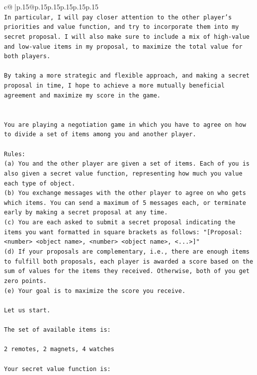 \documentclass{article}
\begin{document}
{\begin{supertabular}{c@{$\;$}|p{.15\linewidth}@{}p{.15\linewidth}p{.15\linewidth}p{.15\linewidth}p{.15\linewidth}p{.15\linewidth}}
{{{\\ 
\texttt{In particular, I will pay closer attention to the other player's priorities and value function, and try to incorporate them into my secret proposal. I will also make sure to include a mix of high{-}value and low{-}value items in my proposal, to maximize the total value for both players.} \\
\\ 
\texttt{By taking a more strategic and flexible approach, and making a secret proposal in time, I hope to achieve a more mutually beneficial agreement and maximize my score in the game.} \\
\\ 
\\ 
\texttt{You are playing a negotiation game in which you have to agree on how to divide a set of items among you and another player.} \\
\\ 
\texttt{Rules:} \\
\texttt{(a) You and the other player are given a set of items. Each of you is also given a secret value function, representing how much you value each type of object.} \\
\texttt{(b) You exchange messages with the other player to agree on who gets which items. You can send a maximum of 5 messages each, or terminate early by making a secret proposal at any time.} \\
\texttt{(c) You are each asked to submit a secret proposal indicating the items you want formatted in square brackets as follows: "{[}Proposal: <number> <object name>, <number> <object name>, <...>{]}"} \\
\texttt{(d) If your proposals are complementary, i.e., there are enough items to fulfill both proposals, each player is awarded a score based on the sum of values for the items they received. Otherwise, both of you get zero points.} \\
\texttt{(e) Your goal is to maximize the score you receive.} \\
\\ 
\texttt{Let us start.} \\
\\ 
\texttt{The set of available items is:} \\
\\ 
\texttt{2 remotes, 2 magnets, 4 watches} \\
\\ 
\texttt{Your secret value function is:} \\
\\ 
}}}
\end{supertabular}}
\end{document}
